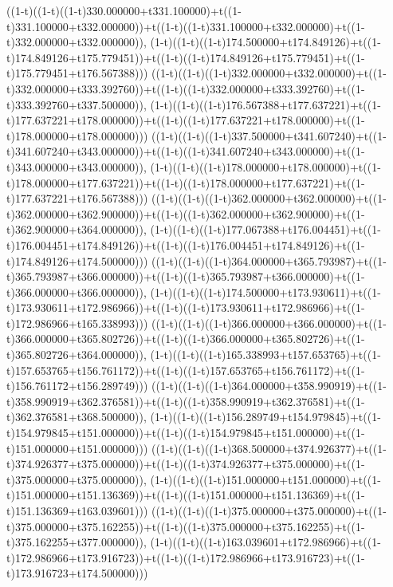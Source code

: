 ((1-t)((1-t)((1-t)330.000000+t331.100000)+t((1-t)331.100000+t332.000000))+t((1-t)((1-t)331.100000+t332.000000)+t((1-t)332.000000+t332.000000)),                                     (1-t)((1-t)((1-t)174.500000+t174.849126)+t((1-t)174.849126+t175.779451))+t((1-t)((1-t)174.849126+t175.779451)+t((1-t)175.779451+t176.567388)))
((1-t)((1-t)((1-t)332.000000+t332.000000)+t((1-t)332.000000+t333.392760))+t((1-t)((1-t)332.000000+t333.392760)+t((1-t)333.392760+t337.500000)),                                     (1-t)((1-t)((1-t)176.567388+t177.637221)+t((1-t)177.637221+t178.000000))+t((1-t)((1-t)177.637221+t178.000000)+t((1-t)178.000000+t178.000000)))
((1-t)((1-t)((1-t)337.500000+t341.607240)+t((1-t)341.607240+t343.000000))+t((1-t)((1-t)341.607240+t343.000000)+t((1-t)343.000000+t343.000000)),                                     (1-t)((1-t)((1-t)178.000000+t178.000000)+t((1-t)178.000000+t177.637221))+t((1-t)((1-t)178.000000+t177.637221)+t((1-t)177.637221+t176.567388)))
((1-t)((1-t)((1-t)362.000000+t362.000000)+t((1-t)362.000000+t362.900000))+t((1-t)((1-t)362.000000+t362.900000)+t((1-t)362.900000+t364.000000)),                                     (1-t)((1-t)((1-t)177.067388+t176.004451)+t((1-t)176.004451+t174.849126))+t((1-t)((1-t)176.004451+t174.849126)+t((1-t)174.849126+t174.500000)))
((1-t)((1-t)((1-t)364.000000+t365.793987)+t((1-t)365.793987+t366.000000))+t((1-t)((1-t)365.793987+t366.000000)+t((1-t)366.000000+t366.000000)),                                     (1-t)((1-t)((1-t)174.500000+t173.930611)+t((1-t)173.930611+t172.986966))+t((1-t)((1-t)173.930611+t172.986966)+t((1-t)172.986966+t165.338993)))
((1-t)((1-t)((1-t)366.000000+t366.000000)+t((1-t)366.000000+t365.802726))+t((1-t)((1-t)366.000000+t365.802726)+t((1-t)365.802726+t364.000000)),                                     (1-t)((1-t)((1-t)165.338993+t157.653765)+t((1-t)157.653765+t156.761172))+t((1-t)((1-t)157.653765+t156.761172)+t((1-t)156.761172+t156.289749)))
((1-t)((1-t)((1-t)364.000000+t358.990919)+t((1-t)358.990919+t362.376581))+t((1-t)((1-t)358.990919+t362.376581)+t((1-t)362.376581+t368.500000)),                                     (1-t)((1-t)((1-t)156.289749+t154.979845)+t((1-t)154.979845+t151.000000))+t((1-t)((1-t)154.979845+t151.000000)+t((1-t)151.000000+t151.000000)))
((1-t)((1-t)((1-t)368.500000+t374.926377)+t((1-t)374.926377+t375.000000))+t((1-t)((1-t)374.926377+t375.000000)+t((1-t)375.000000+t375.000000)),                                     (1-t)((1-t)((1-t)151.000000+t151.000000)+t((1-t)151.000000+t151.136369))+t((1-t)((1-t)151.000000+t151.136369)+t((1-t)151.136369+t163.039601)))
((1-t)((1-t)((1-t)375.000000+t375.000000)+t((1-t)375.000000+t375.162255))+t((1-t)((1-t)375.000000+t375.162255)+t((1-t)375.162255+t377.000000)),                                     (1-t)((1-t)((1-t)163.039601+t172.986966)+t((1-t)172.986966+t173.916723))+t((1-t)((1-t)172.986966+t173.916723)+t((1-t)173.916723+t174.500000)))
